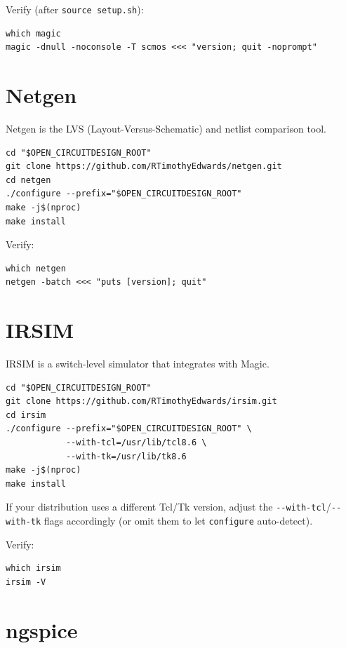 \documentclass[11pt]{article}
\begin{document}
Verify (after \texttt{source setup.sh}):

\begin{lstlisting}
which magic
magic -dnull -noconsole -T scmos <<< "version; quit -noprompt"
\end{lstlisting}

\section{Netgen}

Netgen is the LVS (Layout-Versus-Schematic) and netlist comparison tool.

\begin{lstlisting}
cd "$OPEN_CIRCUITDESIGN_ROOT"
git clone https://github.com/RTimothyEdwards/netgen.git
cd netgen
./configure --prefix="$OPEN_CIRCUITDESIGN_ROOT"
make -j$(nproc)
make install
\end{lstlisting}

Verify:

\begin{lstlisting}
which netgen
netgen -batch <<< "puts [version]; quit"
\end{lstlisting}

\section{IRSIM}

IRSIM is a switch-level simulator that integrates with Magic.

\begin{lstlisting}
cd "$OPEN_CIRCUITDESIGN_ROOT"
git clone https://github.com/RTimothyEdwards/irsim.git
cd irsim
./configure --prefix="$OPEN_CIRCUITDESIGN_ROOT" \
            --with-tcl=/usr/lib/tcl8.6 \
            --with-tk=/usr/lib/tk8.6
make -j$(nproc)
make install
\end{lstlisting}

If your distribution uses a different Tcl/Tk version, adjust the
\texttt{-{}-with-tcl}/\texttt{-{}-with-tk} flags accordingly (or omit them to
let \texttt{configure} auto-detect).

Verify:

\begin{lstlisting}
which irsim
irsim -V
\end{lstlisting}

\section{ngspice}
\end{document}
